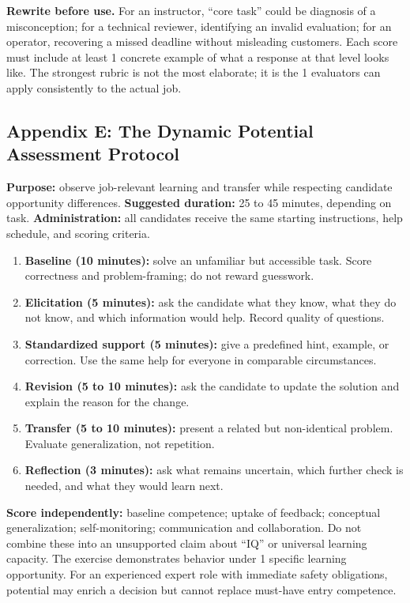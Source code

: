 \noindent\textbf{Rewrite before use.} For an instructor, ``core task'' could be diagnosis of a misconception; for a technical reviewer, identifying an invalid evaluation; for an operator, recovering a missed deadline without misleading customers. Each score must include at least 1 concrete example of what a response at that level looks like. The strongest rubric is not the most elaborate; it is the 1 evaluators can apply consistently to the actual job.

\subsection*{Appendix E: The Dynamic Potential Assessment Protocol}

\noindent\textbf{Purpose:} observe job-relevant learning and transfer while respecting candidate opportunity differences. \textbf{Suggested duration:} 25 to 45 minutes, depending on task. \textbf{Administration:} all candidates receive the same starting instructions, help schedule, and scoring criteria.

\begin{enumerate}
    \item \textbf{Baseline (10 minutes):} solve an unfamiliar but accessible task. Score correctness and problem-framing; do not reward guesswork.
    \item \textbf{Elicitation (5 minutes):} ask the candidate what they know, what they do not know, and which information would help. Record quality of questions.
    \item \textbf{Standardized support (5 minutes):} give a predefined hint, example, or correction. Use the same help for everyone in comparable circumstances.
    \item \textbf{Revision (5 to 10 minutes):} ask the candidate to update the solution and explain the reason for the change.
    \item \textbf{Transfer (5 to 10 minutes):} present a related but non-identical problem. Evaluate generalization, not repetition.
    \item \textbf{Reflection (3 minutes):} ask what remains uncertain, which further check is needed, and what they would learn next.
\end{enumerate}

\noindent\textbf{Score independently:} baseline competence; uptake of feedback; conceptual generalization; self-monitoring; communication and collaboration. Do not combine these into an unsupported claim about ``IQ'' or universal learning capacity. The exercise demonstrates behavior under 1 specific learning opportunity. For an experienced expert role with immediate safety obligations, potential may enrich a decision but cannot replace must-have entry competence.

